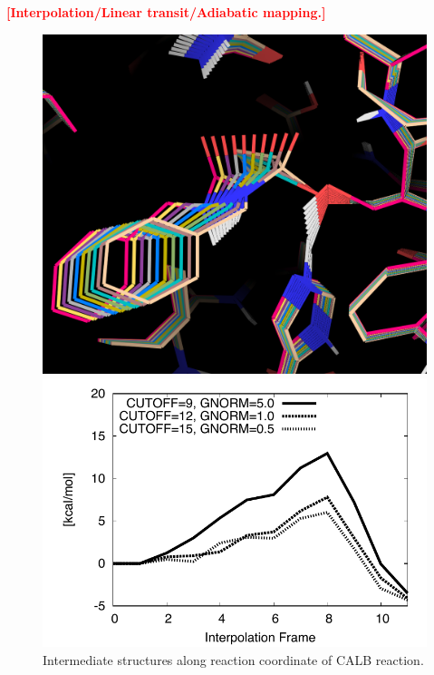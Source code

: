 \textcolor{red}{\textbf{[Interpolation/Linear transit/Adiabatic mapping.]}}
\begin{figure}[htbp] 
\centering
\begin{minipage}{0.43\linewidth}
\includegraphics[width=0.90\linewidth]{wt-ini.png}
\end{minipage}
\begin{minipage}{0.55\linewidth}
\includegraphics[width=1.00\linewidth]{calb-conv.pdf}
\end{minipage}
\caption{
Intermediate structures along reaction coordinate of CALB reaction.
}
\label{fig:calb_reaction}
\end{figure}



